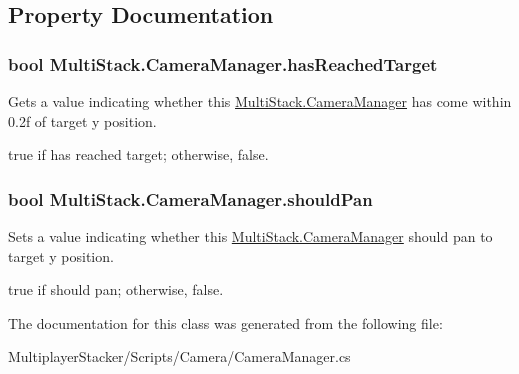 \subsection{Property Documentation}
\hypertarget{class_multi_stack_1_1_camera_manager_a47e71a3bf314c2f2dba156fc47e26127}{}
\subsubsection[{has\+Reached\+Target}]{\setlength{\rightskip}{0pt plus 5cm}bool Multi\+Stack.\+Camera\+Manager.\+has\+Reached\+Target\hspace{0.3cm}{\ttfamily [get]}}\label{class_multi_stack_1_1_camera_manager_a47e71a3bf314c2f2dba156fc47e26127}


Gets a value indicating whether this \hyperlink{class_multi_stack_1_1_camera_manager}{Multi\+Stack.\+Camera\+Manager} has come within 0.\+2f of target y position. 

{\ttfamily true} if has reached target; otherwise, {\ttfamily false}.\hypertarget{class_multi_stack_1_1_camera_manager_aa36c3004b512594116595bc980734321}{}
\subsubsection[{should\+Pan}]{\setlength{\rightskip}{0pt plus 5cm}bool Multi\+Stack.\+Camera\+Manager.\+should\+Pan\hspace{0.3cm}{\ttfamily [set]}}\label{class_multi_stack_1_1_camera_manager_aa36c3004b512594116595bc980734321}


Sets a value indicating whether this \hyperlink{class_multi_stack_1_1_camera_manager}{Multi\+Stack.\+Camera\+Manager} should pan to target y position. 

{\ttfamily true} if should pan; otherwise, {\ttfamily false}.

The documentation for this class was generated from the following file\+:\begin{DoxyCompactItemize}
\item 
Multiplayer\+Stacker/\+Scripts/\+Camera/Camera\+Manager.\+cs\end{DoxyCompactItemize}
